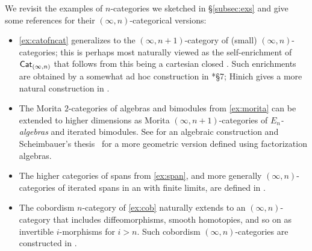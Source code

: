 \documentclass[a4paper,11pt]{article}
\begin{document}
\begin{remark}\label{rmk:exs}
  We revisit the examples of $n$-categories we sketched in
  \S\ref{subsec:exs} and give some references for their
  $(\infty,n)$-categorical versions:
  \begin{itemize}
  \item \cref{ex:catofncat} generalizes to the $(\infty,n+1)$-category
    of (small) $(\infty,n)$-categories; this is perhaps most naturally
    viewed as the self-enrichment of $\textup{\textsf{Cat}}_{(\infty,n)}$ that follows
    from this being a cartesian closed \icat{}. Such enrichments are
    obtained by a somewhat ad hoc construction in \cite{enr}*{\S 7};
    Hinich gives a more natural construction in \cite{HinichYoneda}.
  \item The Morita $2$-categories of algebras and bimodules from
    \cref{ex:morita} can be extended to higher dimensions as Morita
    $(\infty,n+1)$-categories of \emph{$E_{n}$-algebras} and iterated
    bimodules. See \cite{nmorita} for an algebraic construction and
    Scheimbauer's thesis~\cite{ScheimbauerThesis} for a more geometric
    version defined using factorization algebras.
  \item The higher categories of spans from \cref{ex:span}, and more
    generally $(\infty,n)$-categories of iterated spans
    in an \icat{} with finite limits, are defined in \cite{spans}.
  \item The cobordism $n$-category of \cref{ex:cob} naturally extends
    to an $(\infty,n)$-category that includes diffeomorphisms, smooth
    homotopies, and so on as invertible $i$-morphisms for $i >
    n$. Such cobordism $(\infty,n)$-categories are constructed in
    \cite{CSBord}.
  \end{itemize}
\end{remark}
\end{document}
